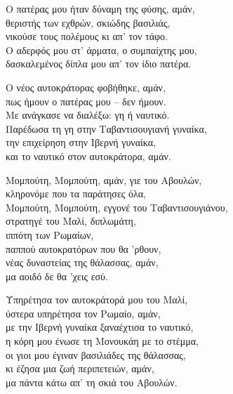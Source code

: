 \begin{lyrics}
Ο πατέρας μου ήταν δύναμη της φύσης, αμάν,\\
θεριστής των εχθρών, σκιώδης βασιλιάς,\\
νικούσε τους πολέμους κι απ' τον τάφο.\\
Ο αδερφός μου στ' άρματα, ο συμπαίχτης μου,\\
δασκαλεμένος δίπλα μου απ' τον ίδιο πατέρα.

Ο νέος αυτοκράτορας φοβήθηκε, αμάν,\\
πως ήμουν ο πατέρας μου -- δεν ήμουν.\\
Με ανάγκασε να διαλέξω: γη ή ναυτικό.\\
Παρέδωσα τη γη στην Ταβαντισουγιανή γυναίκα,\\
την επιχείρηση στην Ιβερνή γυναίκα,\\
και το ναυτικό στον αυτοκράτορα, αμάν.

Μομπούτη, Μομπούτη, αμάν, γιε του Αβουλών,\\
κληρονόμε που τα παράτησες όλα,\\
Μομπούτη, Μομπούτη, εγγονέ του Ταβαντισουγιάνου,\\
στρατηγέ του Μαλί, διπλωμάτη,\\
ιππότη των Ρωμαίων,\\
παππού αυτοκρατόρων που θα 'ρθουν,\\
νέας δυναστείας της θάλασσας, αμάν,\\
μα αοιδό δε θα 'χεις εσύ.

Υπηρέτησα τον αυτοκράτορά μου του Μαλί,\\
ύστερα υπηρέτησα τον Ρωμαίο, αμάν,\\
με την Ιβερνή γυναίκα ξαναέχτισα το ναυτικό,\\
η κόρη μου ένωσε τη Μονουκάη με το στέμμα,\\
οι γιοι μου έγιναν βασιλιάδες της θάλασσας,\\
κι έζησα μια ζωή περιπετειών, αμάν,\\
μα πάντα κάτω απ' τη σκιά του Αβουλών.
\end{lyrics}

